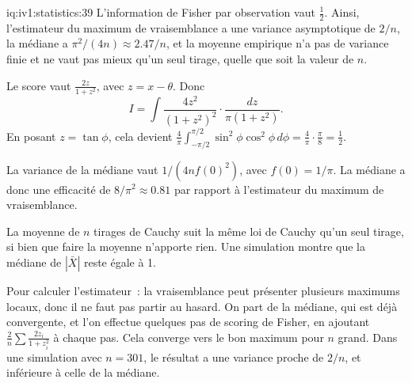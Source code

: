 \begin{solution}{iq:iv1:statistics:39}
L'information de Fisher par observation vaut $\tfrac12$. Ainsi, l'estimateur du maximum de vraisemblance a une variance asymptotique de $2/n$, la médiane a $\pi^2/(4n) \approx 2.47/n$, et la moyenne empirique n'a pas de variance finie et ne vaut pas mieux qu'un seul tirage, quelle que soit la valeur de $n$.

Le score vaut $\frac{2z}{1 + z^2}$, avec $z = x - \theta$. Donc
\[
I = \int \frac{4z^2}{(1 + z^2)^2} \cdot \frac{dz}{\pi(1 + z^2)}.
\]
En posant $z = \tan\phi$, cela devient $\frac{4}{\pi}\int_{-\pi/2}^{\pi/2} \sin^2\phi\cos^2\phi\, d\phi = \frac{4}{\pi} \cdot \frac{\pi}{8} = \tfrac12$.

La variance de la médiane vaut $1/(4nf(0)^2)$, avec $f(0) = 1/\pi$. La médiane a donc une efficacité de $8/\pi^2 \approx 0.81$ par rapport à l'estimateur du maximum de vraisemblance.

La moyenne de $n$ tirages de Cauchy suit la même loi de Cauchy qu'un seul tirage, si bien que faire la moyenne n'apporte rien. Une simulation montre que la médiane de $|\bar{X}|$ reste égale à 1.

Pour calculer l'estimateur~: la vraisemblance peut présenter plusieurs maximums locaux, donc il ne faut pas partir au hasard. On part de la médiane, qui est déjà convergente, et l'on effectue quelques pas de scoring de Fisher, en ajoutant $\frac{2}{n}\sum \frac{2z_i}{1 + z_i^2}$ à chaque pas. Cela converge vers le bon maximum pour $n$ grand. Dans une simulation avec $n = 301$, le résultat a une variance proche de $2/n$, et inférieure à celle de la médiane.

\end{solution}


